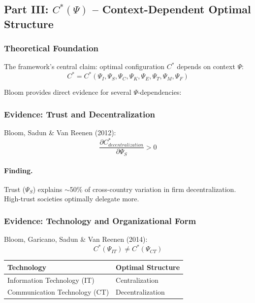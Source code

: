 \subsection{Part III: $C^*(\Psi)$ – Context-Dependent Optimal Structure}

\subsubsection{Theoretical Foundation}

The framework's central claim: optimal configuration $C^*$ depends on context $\Psi$:
\begin{equation}
C^* = C^*(\Psi_I, \Psi_S, \Psi_C, \Psi_K, \Psi_E, \Psi_T, \Psi_M, \Psi_F)
\end{equation}

Bloom provides direct evidence for several $\Psi$-dependencies:

\subsubsection{Evidence: Trust and Decentralization}

Bloom, Sadun \& Van Reenen (2012):
\begin{equation}
\boxed{
\frac{\partial C^*_{decentralization}}{\partial \Psi_S} > 0
}
\label{eq:bloom-trust}
\end{equation}

\paragraph{Finding.}
Trust ($\Psi_S$) explains $\sim$50\% of cross-country variation in firm 
decentralization. High-trust societies optimally delegate more.

\subsubsection{Evidence: Technology and Organizational Form}

Bloom, Garicano, Sadun \& Van Reenen (2014):
\begin{equation}
C^*(\Psi_{IT}) \neq C^*(\Psi_{CT})
\end{equation}

\begin{center}
\begin{tabular}{ll}
\hline
\textbf{Technology} & \textbf{Optimal Structure} \\
\hline
Information Technology (IT) & Centralization \\
Communication Technology (CT) & Decentralization \\
\hline
\end{tabular}
\end{center}

